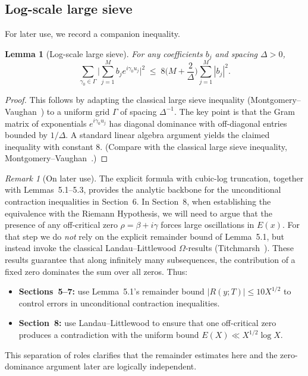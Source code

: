 \documentclass[11pt]{article}
\theoremstyle{plain}
\newtheorem{lemma}[theorem]{Lemma}
\theoremstyle{definition}
\theoremstyle{remark}
\newtheorem*{remark}{Remark}
\begin{document}
\subsection{Log-scale large sieve}

For later use, we record a companion inequality.

\begin{lemma}[Log-scale large sieve]\label{lem:sieve}
For any coefficients $b_j$ and spacing $\Delta>0$,
\[
\sum_{\gamma_0\in \Gamma} \Big|\sum_{j=1}^M b_j e^{i\gamma_0 u_j}\Big|^2
\;\leq\; 8\Big(M+\frac{2}{\Delta}\Big)\sum_{j=1}^M |b_j|^2.
\]
\end{lemma}

\begin{proof}
This follows by adapting the classical large sieve inequality (Montgomery--Vaughan~\cite[Theorem~7.1]{MontgomeryVaughanClassical}) to a uniform grid
 $\Gamma$ of spacing $\Delta^{-1}$. The key point is that the Gram matrix of exponentials $e^{i\gamma_0 u_j}$ has diagonal dominance with off-diagonal entries bounded by $1/\Delta$. A standard linear algebra argument yields the claimed inequality with constant $8$. (Compare with the classical large sieve inequality,
Montgomery--Vaughan~\cite[Thm.~7.1]{MontgomeryVaughanClassical}.)
\end{proof}

\begin{remark}[On later use]
The explicit formula with cubic-log truncation, together with Lemmas~5.1--5.3, 
provides the analytic backbone for the unconditional contraction inequalities in 
Section~6. In Section~8, when establishing the equivalence with the Riemann 
Hypothesis, we will need to argue that the presence of any off-critical zero 
$\rho=\beta+i\gamma$ forces large oscillations in $E(x)$. For that step we do 
\emph{not} rely on the explicit remainder bound of Lemma~5.1, but instead 
invoke the classical Landau--Littlewood $\Omega$-results 
(Titchmarsh~\cite[§14.25]{Titchmarsh}). These results guarantee that along 
infinitely many subsequences, the contribution of a fixed zero dominates the 
sum over all zeros. Thus:
\begin{itemize}
    \item \textbf{Sections~5--7:} use Lemma~5.1’s remainder bound 
    $|R(y;T)|\le 10X^{1/2}$ to control errors in unconditional contraction 
    inequalities.
    \item \textbf{Section~8:} use Landau--Littlewood to ensure that one 
    off-critical zero produces a contradiction with the uniform bound 
    $E(X)\ll X^{1/2}\log X$.
\end{itemize}
This separation of roles clarifies that the remainder estimates here and the 
zero-dominance argument later are logically independent.
\end{remark}
\end{document}
